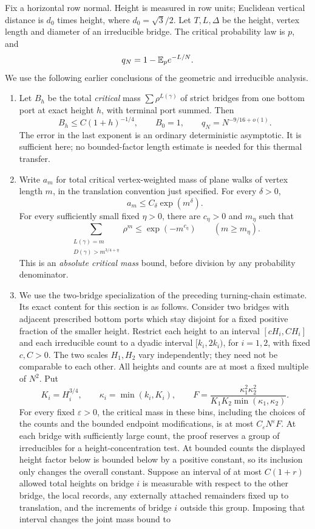 Fix a horizontal row normal. Height is measured in row units; Euclidean vertical distance is $d_0$ times height, where $d_0=\sqrt3/2$. Let $T,L,\Delta$ be the height, vertex length and diameter of an irreducible bridge. The critical probability law is $p$, and
\[
 q_N=1-\mathbb E_p e^{-L/N}.
\]
We use the following earlier conclusions of the geometric and irreducible analysis.
\begin{enumerate}
\item Let $B_h$ be the total \emph{critical} mass $\sum\rho^{L(\gamma)}$ of strict bridges from one bottom port at exact height $h$, with terminal port summed. Then
\begin{equation}\label{eq:strip-input}
 B_h\le C(1+h)^{-1/4},\qquad B_0=1,
 \qquad q_N=N^{-9/16+o(1)}.
\end{equation}
The error in the last exponent is an ordinary deterministic asymptotic. It is sufficient here; no bounded-factor length estimate is needed for this thermal transfer.
\item Write $a_m$ for total critical vertex-weighted mass of plane walks of vertex length $m$, in the translation convention just specified. For every $\delta>0$,
\begin{equation}\label{eq:count-input}
 a_m\le C_\delta\exp(m^\delta).
\end{equation}
For every sufficiently small fixed $\eta>0$, there are $c_\eta>0$ and $m_\eta$ such that
\begin{equation}\label{eq:fast-input}
 \sum_{\substack{L(\gamma)=m\\D(\gamma)>m^{3/4+\eta}}}
       \rho^m\le \exp(-m^{c_\eta})\qquad(m\ge m_\eta).
\end{equation}
This is an \emph{absolute critical mass} bound, before division by any probability denominator.
\item We use the two-bridge specialization of the preceding turning-chain estimate. Its exact content for this section is as follows. Consider two bridges with adjacent prescribed bottom ports which stay disjoint for a fixed positive fraction of the smaller height. Restrict each height to an interval $[cH_i,CH_i]$ and each irreducible count to a dyadic interval $[k_i,2k_i)$, for $i=1,2$, with fixed $c,C>0$. The two scales $H_1,H_2$ vary independently; they need not be comparable to each other. All heights and counts are at most a fixed multiple of $N^2$. Put
\[
 K_i=H_i^{3/4},\qquad \kappa_i=\min(k_i,K_i),\qquad
 F=\frac{\kappa_1^2\kappa_2^2}
          {K_1K_2\min(\kappa_1,\kappa_2)}.
\]
For every fixed $\varepsilon>0$, the critical mass in these bins, including the choices of the counts and the bounded endpoint modifications, is at most $C_\varepsilon N^\varepsilon F$. At each bridge with sufficiently large count, the proof reserves a group of irreducibles for a height-concentration test. At bounded counts the displayed height factor below is bounded below by a positive constant, so its inclusion only changes the overall constant. Suppose an interval of at most $C(1+r)$ allowed total heights on bridge $i$ is measurable with respect to the other bridge, the local records, any externally attached remainders fixed up to translation, and the increments of bridge $i$ outside this group. Imposing that interval changes the joint mass bound to

\end{enumerate}
